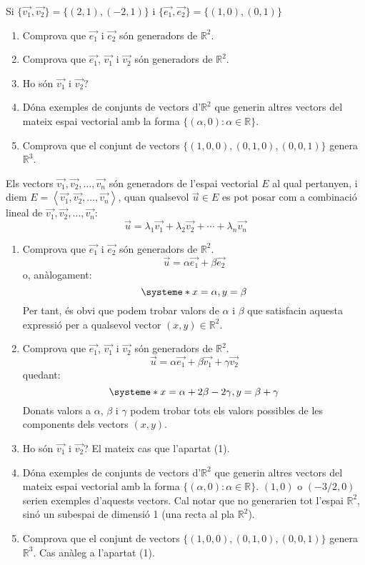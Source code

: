 \Exercise Si $\{\overrightarrow{v_1},\overrightarrow{v_2}\} = \{ (2,1),(-2,1) \}$ i $\{\overrightarrow{e_1},\overrightarrow{e_2}\} = \{ (1,0),(0,1) \}$
\begin{enumerate}
  \item Comprova que $\overrightarrow{e_1}$ i $\overrightarrow{e_2}$ són generadors de $\mathbb{R}^2$.
  \item Comprova que $\overrightarrow{e_1}$, $\overrightarrow{v_1}$ i $\overrightarrow{v_2}$ són generadors de $\mathbb{R}^2$.
  \item Ho són $\overrightarrow{v_1}$ i $\overrightarrow{v_2}$?
  \item Dóna exemples de conjunts de vectors d'$\mathbb{R}^2$ que generin altres vectors del mateix espai vectorial amb la forma $\{(\alpha,0):\alpha \in  \mathbb{R} \}$.
  \item Comprova que el conjunt de vectors $\{(1,0,0),(0,1,0),(0,0,1)\}$ genera $\mathbb{R}^3$.
\end{enumerate}

\Answer Els vectors $\overrightarrow{v_1},\overrightarrow{v_2}, \ldots, \overrightarrow{v_n}$ són generadors de l'espai vectorial $E$ al qual pertanyen, i diem $E=\left<\overrightarrow{v_1},\overrightarrow{v_2}, \ldots, \overrightarrow{v_n}\right>$, quan qualsevol $\vec{u}\in E$ es pot posar com a combinació lineal de $\overrightarrow{v_1},\overrightarrow{v_2}, \ldots, \overrightarrow{v_n}$:
\[\vec{u} = \lambda_1 \overrightarrow{v_1} + \lambda_2 \overrightarrow{v_2} + \cdots + \lambda_n \overrightarrow{v_n}\]


\begin{enumerate}
  \item Comprova que $\overrightarrow{e_1}$ i $\overrightarrow{e_2}$ són generadors de $\mathbb{R}^2$.
  \[\vec{u} = \alpha \overrightarrow{e_1} + \beta \overrightarrow{e_2}\]
  o, anàlogament:
  \[
    \systeme*{x=\alpha,y=\beta}
  \]
  Per tant, és obvi que podem trobar valors de $\alpha$ i $\beta$ que satisfacin aquesta expressió per a qualsevol vector $(x,y)\in \mathbb{R}^2$. 
  \item Comprova que $\overrightarrow{e_1}$, $\overrightarrow{v_1}$ i $\overrightarrow{v_2}$ són generadors de $\mathbb{R}^2$.
  \[\vec{u} = \alpha \overrightarrow{e_1} + \beta \overrightarrow{v_1} + \gamma \overrightarrow{v_2}\]
  quedant:
  \[
    \systeme*{x=\alpha+2\beta-2\gamma,y=\beta+\gamma}
  \]
  Donats  valors a $\alpha$, $\beta$ i $\gamma$ podem trobar tots els valors possibles de les components dels vectors $(x,y)$.
  \item Ho són $\overrightarrow{v_1}$ i $\overrightarrow{v_2}$?
  El mateix cas que l'apartat (1).
  \item Dóna exemples de conjunts de vectors d'$\mathbb{R}^2$ que generin altres vectors del mateix espai vectorial amb la forma $\{(\alpha,0):\alpha \in  \mathbb{R} \}$.
  $(1,0)$ o $(-3/2,0)$ serien exemples d'aquests vectors. Cal notar que no generarien tot l'espai $\mathbb{R}^2$, sinó un subespai de dimensió 1 (una recta al pla $\mathbb{R}^2$).
  \item Comprova que el conjunt de vectors $\{(1,0,0),(0,1,0),(0,0,1)\}$ genera $\mathbb{R}^3$.
  Cas anàleg a l'apartat (1).
\end{enumerate}
\blacksquare

